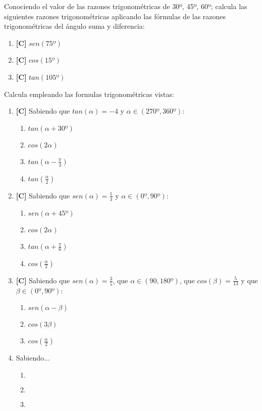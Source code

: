 \Exercicio Conociendo el valor de las razones trigonométricas de 30º, 45º, 60º; calcula las siguientes razones trigonométricas aplicando las fórmulas de las razones trigonométricas del ángulo suma y diferencia:

\begin{enumerate}[topsep=0pt]
	\item \textbf{[C]} $sen(75º)$
	\item \textbf{[C]} $cos(15º)$
	\item \textbf{[C]} $tan(105º)$
\end{enumerate}


\Exercicio Calcula empleando las formulas trigonométricas vistas:

\begin{enumerate}[topsep=0pt]
	\item \textbf{[C]} Sabiendo que $tan(\alpha) = -4$ y $\alpha \in (270º,360º)$:
		\begin{enumerate}[topsep=0pt, label=\arabic*)]
		\item  $tan(\alpha + 30º)$
		\item $cos(2\alpha)$
		\item $tan(\alpha - \frac{\pi}{3})$
		\item $tan(\frac{\alpha}{2})$
		\end{enumerate}

	\item \textbf{[C]} Sabiendo que $sen(\alpha) = \frac{1}{3}$ y $\alpha \in (0º,90º)$:
		\begin{enumerate}[topsep=0pt, label=\arabic*)]
		\item $sen(\alpha + 45º)$
		\item $cos(2\alpha)$
		\item $tan(\alpha + \frac{\pi}{6})$
		\item $cos(\frac{\alpha}{2})$
		\end{enumerate}
	\item \textbf{[C]} Sabiendo que $sen(\alpha) = \frac{3}{5}$, que $\alpha \in (90,180º)$, que $cos(\beta) = \frac{5}{13}$ y que $ \beta \in (0º,90º)$:
		\begin{enumerate}[topsep=0pt, label=\arabic*)]
		\item $sen(\alpha - \beta)$
		\item $cos(3\beta)$
		\item $cos(\frac{\alpha}{2})$
		\end{enumerate}
	\item Sabiendo...
		\begin{enumerate}[topsep=0pt, label=\arabic*)]
		\item $ $
		\item $ $
		\item $ $
		\end{enumerate}
\end{enumerate}


